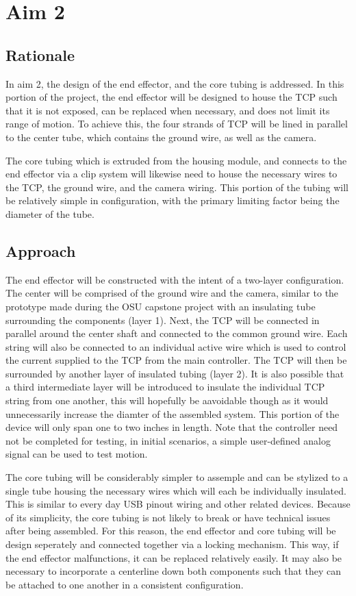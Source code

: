 \section{Aim 2}

\subsection{Rationale}

In aim 2, the design of the end effector, and the core tubing is addressed. In this portion of the project, the end effector will be designed to house the TCP such that it is not exposed, can be replaced when necessary, and does not limit its range of motion. To achieve this, the four strands of TCP will be lined in parallel to the center tube, which contains the ground wire, as well as the camera.

The core tubing which is extruded from the housing module, and connects to the end effector via a clip system will likewise need to house the necessary wires to the TCP, the ground wire, and the camera wiring. This portion of the tubing will be relatively simple in configuration, with the primary limiting factor being the diameter of the tube.

\subsection{Approach}

The end effector will be constructed with the intent of a two-layer configuration. The center will be comprised of the ground wire and the camera, similar to the prototype made during the OSU capstone project with an insulating tube surrounding the components (layer 1). Next, the TCP will be connected in parallel around the center shaft and connected to the common ground wire. Each string will also be connected to an individual active wire which is used to control the current supplied to the TCP from the main controller. The TCP will then be surrounded by another layer of insulated tubing (layer 2). It is also possible that a third intermediate layer will be introduced to insulate the individual TCP string from one another, this will hopefully be aavoidable though as it would unnecessarily increase the diamter of the assembled system. This portion of the device will only span one to two inches in length. Note that the controller need not be completed for testing, in initial scenarios, a simple user-defined analog signal can be used to test motion.

The core tubing will be considerably simpler to assemple and can be stylized to a single tube housing the necessary wires which will each be individually insulated. This is similar to every day USB pinout wiring and other related devices. Because of its simplicity, the core tubing is not likely to break or have technical issues after being assembled. For this reason, the end effector and core tubing will be design seperately and connected together via a locking mechanism. This way, if the end effector malfunctions, it can be replaced relatively easily. It may also be necessary to incorporate a centerline down both components such that they can be attached to one another in a consistent configuration.

